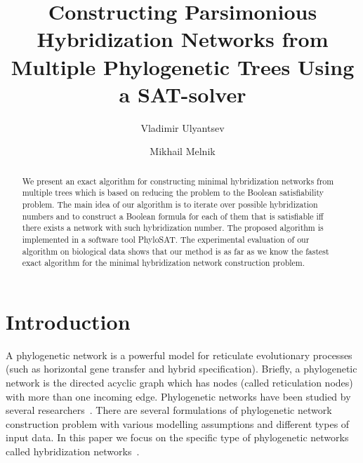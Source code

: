 \documentclass[runningheads, envcountsame, a4paper]{llncs}
\begin{document}
\mainmatter           
\title{Constructing Parsimonious Hybridization Networks from Multiple Phylogenetic Trees Using a SAT-solver}
\toctitle{ }

\author{Vladimir Ulyantsev \and Mikhail Melnik}

\maketitle
\setcounter{footnote}{0}

\begin{abstract}
  We present an exact algorithm for constructing minimal hybridization networks from multiple trees 
  which is based on reducing 
  the problem to the Boolean satisfiability problem. The main idea of our algorithm is to iterate over
  possible hybridization numbers and to construct a Boolean formula for each of them that is satisfiable iff there
  exists a network with such hybridization number. The proposed algorithm is implemented in a software tool PhyloSAT.
  The experimental evaluation of our algorithm on biological data shows that our method is as far as we know the 
  fastest exact algorithm for the minimal hybridization network construction problem.

\end{abstract}

\section{Introduction}

A phylogenetic network is a powerful model for reticulate
evolutionary processes (such as horizontal gene transfer and hybrid specification).
Briefly, a phylogenetic network is the directed acyclic graph which has
nodes (called reticulation nodes) with more than one incoming edge. Phylogenetic
networks have been studied by several researchers~\cite{huson2010phylogenetic, morrison2011introduction, 
nakhleh2011evolutionary}. There are several formulations of phylogenetic network
construction problem with various modelling assumptions and different types of input data. 
In this paper we focus on the specific type of phylogenetic networks called hybridization
networks~\cite{semple2006hybridization, chen2010hybridnet}.
\end{document}
